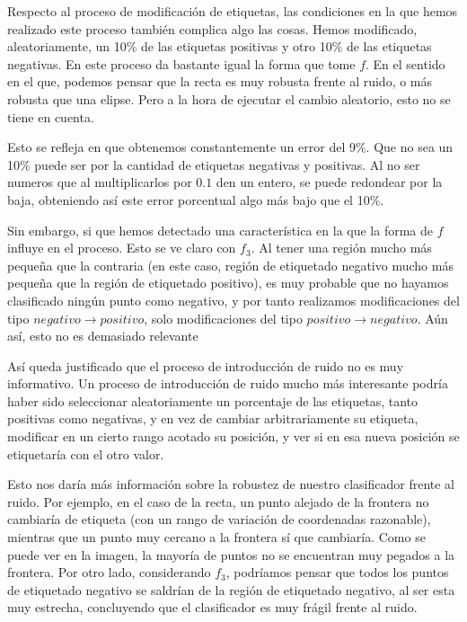\documentclass[11pt]{article}
\begin{document}
Respecto al proceso de modificación de etiquetas, las condiciones en la que hemos realizado este proceso también complica algo las cosas. Hemos modificado, aleatoriamente, un 10\% de las etiquetas positivas y otro 10\% de las etiquetas negativas. En este proceso da bastante igual la forma que tome $f$. En el sentido en el que, podemos pensar que la recta es muy robusta frente al ruido, o más robusta que una elipse. Pero a la hora de ejecutar el cambio aleatorio, esto no se tiene en cuenta.

Esto se refleja en que obtenemos constantemente un error del 9\%. Que no sea un 10\% puede ser por la cantidad de etiquetas negativas y positivas. Al no ser numeros que al multiplicarlos por $0.1$ den un entero, se puede redondear por la baja, obteniendo así este error porcentual algo más bajo que el 10\%.

Sin embargo, si que hemos detectado una característica en la que la forma de $f$ influye en el proceso. Esto se ve claro con $f_3$. Al tener una región mucho más pequeña que la contraria (en este caso, región de etiquetado negativo mucho más pequeña que la región de etiquetado positivo), es muy probable que no hayamos clasificado ningún punto como negativo, y por tanto realizamos modificaciones del tipo $negativo \rightarrow positivo$, solo modificaciones del tipo $positivo \rightarrow negativo$. Aún así, esto no es demasiado relevante

Así queda justificado que el proceso de introducción de ruido no es muy informativo. Un proceso de introducción de ruido mucho más interesante podría haber sido seleccionar aleatoriamente un porcentaje de las etiquetas, tanto positivas como negativas, y en vez de cambiar arbitrariamente su etiqueta, modificar en un cierto rango acotado su posición, y ver si en esa nueva posición se etiquetaría con el otro valor.

Esto nos daría más información sobre la robustez de nuestro clasificador frente al ruido. Por ejemplo, en el caso de la recta, un punto alejado de la frontera no cambiaría de etiqueta (con un rango de variación de coordenadas razonable), mientras que un punto muy cercano a la frontera sí que cambiaría. Como se puede ver en la imagen, la mayoría de puntos no se encuentran muy pegados a la frontera. Por otro lado, considerando $f_3$, podríamos pensar que todos los puntos de etiquetado negativo se saldrían de la región de etiquetado negativo, al ser esta muy estrecha, concluyendo que el clasificador es muy frágil frente al ruido.
\end{document}

